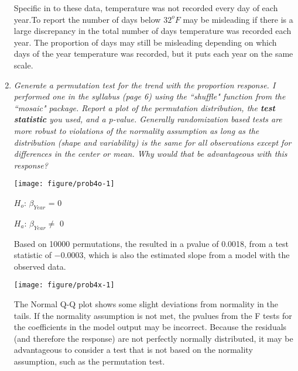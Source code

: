 \documentclass[11pt]{article}\usepackage[]{graphicx}\usepackage[]{color}
\makeatletter
\def\maxwidth{ %
  \ifdim\Gin@nat@width>\linewidth
    \linewidth
  \else
    \Gin@nat@width
  \fi
}
\newenvironment{knitrout}{}{} %
\makeatother
\begin{document}
\begin{enumerate}
Specific in to these data, temperature was not recorded every day of each year.To report the number of days below $32^{o}F$ may be misleading if there is a large discrepancy in the total number of days temperature was recorded each year. The proportion of days may still be misleading depending on which days of the year temperature was recorded, but it puts each year on the same scale.

\item%
{\it Generate a permutation test for the trend with the proportion response. I performed one in the syllabus (page 6) using the ``shuffle" function from the ``mosaic" package. Report a plot of the permutation distribution, the {\bf test statistic} you used, and a p-value. Generally randomization based tests are more robust to violations of the normality assumption as long as the distribution (shape and variability) is the same for all observations except for differences in the {\it center} or mean. Why would that be advantageous with this response?}



\begin{knitrout}\footnotesize
{}\color{fgcolor}

{\centering \texttt{[image: figure/prob4o-1]} 

}



\end{knitrout}

$H_{o}$: $\beta_{Year}$ = 0

$H_{a}$: $\beta_{Year} \neq$ 0

Based on 10000 permutations, the resulted in a pvalue of 0.0018, from a test statistic of \ensuremath{-0.0003}, which is also the estimated slope from a model with the observed data.

\begin{knitrout}\footnotesize
{}\color{fgcolor}

{\centering \texttt{[image: figure/prob4x-1]} 

}



\end{knitrout}
The Normal Q-Q plot shows some slight deviations from normality in the tails. If the normality assumption is not met, the pvalues from the F tests for the coefficients in the model output may be incorrect. Because the residuals (and therefore the response) are not perfectly normally distributed, it may be advantageous to consider a test that is not based on the normality assumption, such as the permutation test.


\end{enumerate}
\end{document}
